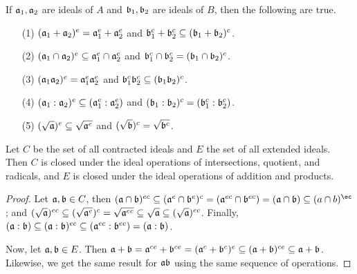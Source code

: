 \begin{lemma}\label{1.10.5}
    If $\af_1,\af_2$ are ideals of $A$ and  $\bf_1,\bf_2$ are ideals of $B$,
    then the following are true.
    \begin{enumerate}
        \item[(1)] $(\af_1+\af_2)^e=\af_1^e+\af_2^e$ and $\bf_1^c+\bf_2^c
            \subseteq (\bf_1+\bf_2)^c$.

        \item[(2)] $(\af_1 \cap \af_2)^e \subseteq \af_1^e \cap \af_2^e$ and
            $\bf_1^c \cap \bf_2^c=(\bf_1 \cap \bf_2)^c$.

        \item[(3)] $(\af_1\af_2)^e=\af_1^e\af_2^e$ and $\bf_1^c\bf_2^c
            \subseteq (\bf_1\bf_2)^c$.

        \item[(4)] $(\af_1:\af_2)^e \subseteq (\af_1^e:\af_2^e)$ and
            $(\bf_1:\bf_2)^c=(\bf_1^c:\bf_2^c)$.

        \item[(5)] $(\sqrt{\af})^e \subseteq \sqrt{\af^e}$ and
            $(\sqrt{\bf})^c=\sqrt{\bf^c}$.
    \end{enumerate}
\end{lemma}
\begin{corollary}
  Let $C$ be the set of all contracted ideals and $E$ the set of all extended
  ideals. Then $C$ is closed under the ideal operations of intersections,
  quotient, and radicals, and  $E$ is closed under the ideal operations of
  addition and products.
\end{corollary}
\begin{proof}
  Let $\af,\bf \in C$, then $(\af \cap \bf)^{ec} \subseteq (\af^e \cap
  \bf^e)^c=(\af^{ec} \cap \bf^{ec})=(\af \cap \bf) \subseteq (a \cap b)^{\ec}$;
  and $(\sqrt{\af})^{ec} \subseteq (\sqrt{\af^e})^c=\sqrt{\af^{ec}} \subseteq
  \sqrt{\af} \subseteq (\sqrt{\af})^{ec}$. Finally, $(\af:\bf) \subseteq
  (\af:\bf)^{ec} \subseteq (\af^{ec}:\bf^{ec})=(\af:\bf)$.

  Now, let $\af, \bf \in E$. Then $\af+\bf=\af^{ce}+\bf^{ce}=(\af^c+\bf^c)^e
  \subseteq (\af+\bf)^{ce} \subseteq \af+\bf$. Likewise, we get the same result
  for $\af\bf$ using the same sequence of operations.
\end{proof}
